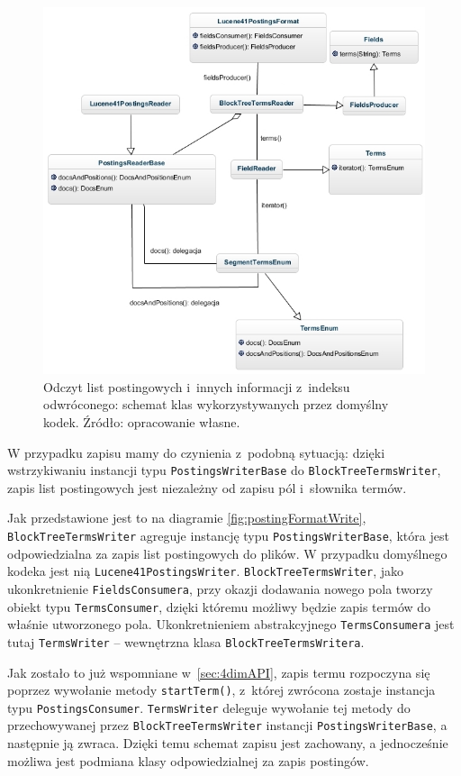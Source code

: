 \begin{figure}[p]
 \includegraphics[scale=0.67]{pictures/Lucene41PostingsFormatRead_2.jpg}
 \caption{Odczyt list postingowych i~innych informacji z~indeksu odwróconego: schemat klas wykorzystywanych przez domyślny kodek. Źródło: opracowanie własne. \label{fig:postingFormatRead}}
\end{figure}

W przypadku zapisu mamy do czynienia z~podobną sytuacją: dzięki wstrzykiwaniu instancji typu \texttt{PostingsWriterBase} do \texttt{BlockTreeTermsWriter}, zapis list postingowych jest niezależny od zapisu pól i~słownika termów.

Jak przedstawione jest to na diagramie \ref{fig:postingFormatWrite}, \texttt{BlockTreeTermsWriter} agreguje instancję typu \texttt{PostingsWriterBase}, która jest odpowiedzialna za zapis list postingowych do plików. W przypadku domyślnego kodeka jest nią \texttt{Lucene41PostingsWriter}. \texttt{BlockTreeTermsWriter}, jako ukonkretnienie \texttt{FieldsConsumera}, przy okazji dodawania nowego pola tworzy obiekt typu \texttt{TermsConsumer}, dzięki któremu możliwy będzie zapis termów do właśnie utworzonego pola. Ukonkretnieniem abstrakcyjnego \texttt{TermsConsumera} jest tutaj \texttt{TermsWriter} -- wewnętrzna klasa \texttt{BlockTreeTermsWritera}.

Jak zostało to już wspomniane w~\ref{sec:4dimAPI}, zapis termu rozpoczyna się poprzez wywołanie metody \texttt{startTerm()}, z~której zwrócona zostaje instancja typu \texttt{PostingsConsumer}. \texttt{TermsWriter} deleguje wywołanie tej metody do przechowywanej przez \texttt{BlockTreeTermsWriter} instancji \texttt{PostingsWriterBase}, a następnie ją zwraca. Dzięki temu schemat zapisu jest zachowany, a jednocześnie możliwa jest podmiana klasy odpowiedzialnej za zapis postingów.

